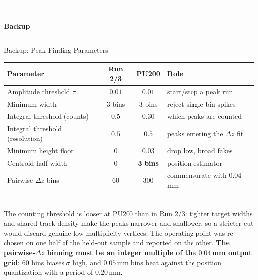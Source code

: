 \documentclass[xcolor=table,aspectratio=169]{beamer}
\newcommand{\backupbegin}{
    \newcounter{finalframe}
    \setcounter{finalframe}{\value{framenumber}}
    \setbeamertemplate{footline}{}
    \begin{frame}[plain]
        \centering
        \vfill
        {\color{pennred!28}\rule{0.30\linewidth}{1.1pt}}\\[0.8em]
        {\LARGE\textbf{\textcolor{pennred}{Backup}}}\\[0.8em]
        {\color{pennred!28}\rule{0.30\linewidth}{1.1pt}}
        \vfill
    \end{frame}
}
\begin{document}
\backupbegin

\begin{frame}{Backup: Peak-Finding Parameters}
    \centering
    \small
    \begin{tabular}{lccl}
        \toprule
        Parameter & Run 2/3 & PU200 & Role \\
        \midrule
        Amplitude threshold $\tau$   & $0.01$ & $0.01$ & start/stop a peak run \\
        Minimum width                & $3$ bins & $3$ bins & reject single-bin spikes \\
        Integral threshold (counts)  & $0.5$  & $\mathbf{0.30}$ & which peaks are counted \\
        Integral threshold (resolution) & $0.5$ & $0.5$ & peaks entering the $\Delta z$ fit \\
        Minimum height floor         & $0$    & $\mathbf{0.03}$ & drop low, broad fakes \\
        Centroid half-width          & $0$    & $\mathbf{3}$ \textbf{bins} & position estimator \\
        Pairwise-$\Delta z$ bins     & $60$   & $300$ & commensurate with $0.04$\,mm \\
        \bottomrule
    \end{tabular}
    \vspace{1em}\\
    {\footnotesize The counting threshold is looser at PU200 than in Run 2/3: tighter
    target widths and shared track density make the peaks narrower and shallower, so a
    stricter cut would discard genuine low-multiplicity vertices. The operating point
    was re-chosen on one half of the held-out sample and reported on the other.
    \textbf{The pairwise-$\Delta z$ binning must be an integer multiple of the
    $0.04$\,mm output grid}: $60$ bins biases $\sigma$ high, and $0.05$\,mm bins beat
    against the position quantization with a period of $0.20$\,mm.}
\end{frame}
\end{document}
